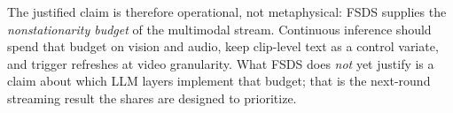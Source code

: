 The justified claim is therefore operational, not metaphysical: FSDS supplies the \emph{nonstationarity budget} of the multimodal stream.
Continuous inference should spend that budget on vision and audio, keep clip-level text as a control variate, and trigger refreshes at video granularity.
What FSDS does \emph{not} yet justify is a claim about which LLM layers implement that budget; that is the next-round streaming result the shares are designed to prioritize.
